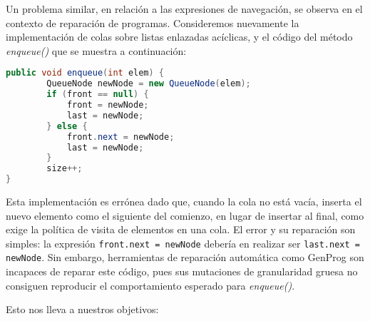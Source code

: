 Un problema similar, en relaci\'on a las expresiones de navegaci\'on, se observa en el contexto de reparaci\'on de programas. Consideremos nuevamente la implementaci\'on de colas sobre listas enlazadas ac\'iclicas, y el c\'odigo del m\'etodo \emph{enqueue()} que se muestra a continuaci\'on:
\begin{lstlisting}[frame=tlrb, mathescape=true, language=Java]
public void enqueue(int elem) {
        QueueNode newNode = new QueueNode(elem);
        if (front == null) {
            front = newNode;
            last = newNode;
        } else {
            front.next = newNode;
            last = newNode;
        }
        size++;
}
\end{lstlisting}
Esta implementaci\'on es err\'onea dado que, cuando la cola no est\'a vac\'ia, inserta el nuevo elemento como el siguiente del comienzo, en lugar de insertar al final, como exige la pol\'itica de visita de elementos en una cola. El error y su reparaci\'on son simples: la expresi\'on \texttt{front.next = newNode} deber\'ia en realizar ser \texttt{last.next = newNode}. Sin embargo, herramientas de reparaci\'on autom\'atica como GenProg son incapaces de reparar este c\'odigo, pues sus mutaciones de granularidad gruesa no consiguen reproducir el comportamiento esperado para \emph{enqueue()}. 

Esto nos lleva a nuestros objetivos:

